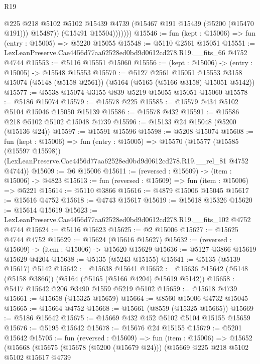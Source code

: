 \begin{lexlean}{R19}
\begin{coremodule}
{{{{{{{{{{{                    @225
                    @218
                    @5102
                    @5102
                    @15439
                    @4739
                    (@15467 @191 @15439 (@5200 (@15470 @191)))
                    @15487))
                (@15491 @15504)))))))
@15546 := fun (kept : @15006) => fun (entry : @15005) => @5220 @15055
@15548 := @5110 @2561 @15051
@15551 := LexLeanPreserve.Cae4456d77aa62528ed0bd9d0612cd278.R19.__fits_66 @4752 @4744
@15553 := @5116 @15551 @15060
@15556 := (kept : @15006) -> (entry : @15005) -> @15548 @15553
@15570 := @5127
    @2561
    @15051
    @15553
    @3158
    @15074
    (@5148 (@5158 @2561))
    (@5164 (@5165 (@5166 @3158) @15051 @5142))
@15577 := @5538 @15074 @3155 @839 @5219 @15055 @15051 @15060
@15578 := @5186 @15074
@15579 := @15578 @225
@15585 := @15579 @434 @5102 @5104 @15046 @15050 @15139
@15586 := @15578 @432
@15591 := @15586 @218 @5102 @5102 @15048 @4739
@15596 := @15133 @24 @15048 (@5200 (@15136 @24))
@15597 := @15591 @15596
@15598 := @5208 @15074
@15608 := fun (kept : @15006) =>
  fun (entry : @15005) =>
  @15570
    (@15577
      (@15585 (@15597 @15598))
      (LexLeanPreserve.Cae4456d77aa62528ed0bd9d0612cd278.R19.__rel_81 @4752 @4744))
@15609 := @6 @15006
@15611 := (reversed : @15609) -> (item : @15006) -> @4823
@15613 := fun (reversed : @15609) => fun (item : @15006) => @5221
@15614 := @5110 @3866
@15616 := @4879 @15006 @15045
@15617 := @15616 @4752
@15618 := @4743 @15617
@15619 := @15618 @15326
@15620 := @15614 @15619
@15623 := LexLeanPreserve.Cae4456d77aa62528ed0bd9d0612cd278.R19.__fits_102 @4752 @4744
@15624 := @5116 @15623
@15625 := @2 @15006
@15627 := @15625 @4744 @4752
@15629 := @15624 (@15616 @15627)
@15632 := (reversed : @15609) -> (item : @15006) -> @15620 @15629
@15636 := @5127 @3866 @15619 @15629 @4204
@15638 := @5135 (@5243 @15155)
@15641 := @5135 (@5139 @15617) @5142
@15642 := @15638 @15641
@15652 := @15636 @15642 (@5148 (@5158 @3866)) (@5164 (@5165 (@5166 @4204) @15619 @5142))
@15658 := @5417 @15642 @206 @3490 @1559 @5219 @5102
@15659 := @15618 @4739
@15661 := @15658 (@15325 @15659)
@15664 := @8560 @15006 @4732 @15045
@15665 := @15664 @4752
@15668 := @15661 (@8559 (@15325 @15665))
@15669 := @5186 @15642
@15675 := @15669 @432 @452 @5102 @5104 @15155 @15659
@15676 := @5195 @15642
@15678 := @15676 @24 @15155
@15679 := @5201 @15642
@15705 := fun (reversed : @15609) =>
  fun (item : @15006) =>
  @15652
    (@15668
      (@15675
        (@15678 (@5200 (@15679 @24)))
        (@15669
          @225
          @218
          @5102
          @5102
          @15617
          @4739
}}}}}}}}}}}
\end{coremodule}
\end{lexlean}
